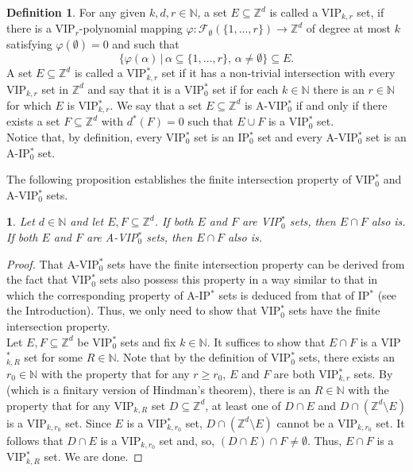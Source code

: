 \documentclass[11pt,american,preprint]{elsarticle}
\numberwithin{equation}{section}
\theoremstyle{plain}
\theoremstyle{plain*}
\theoremstyle{plain}
\theoremstyle{plain*}
\theoremstyle{plain}
\newtheorem{prop}[thm]{\protect\propositionname}
\theoremstyle{plain*}
\theoremstyle{remark}
\theoremstyle{remark*}
\theoremstyle{remark}
\theoremstyle{remark*}
\theoremstyle{remark}
\theoremstyle{remark*}
\theoremstyle{plain}
\theoremstyle{definition}
\newtheorem{defn}[thm]{Definition}
\theoremstyle{plain}
\theoremstyle{plain} %
\providecommand{\propositionname}{Proposition}
\newcommand{\N}{\mathbb{N}}
\newcommand{\Z}{\mathbb{Z}}
\begin{document}
\begin{defn}\label{3.defnOFVIP*}
For any given $k,d,r\in\N$, a set $E\subseteq \Z^d$ is called a VIP$_{k,r}$ set, if there is a VIP$_r$-polynomial mapping $\varphi:\mathcal F_\emptyset(\{1,...,r\})\rightarrow \Z^d$ of degree at most $k$ satisfying $\varphi(\emptyset)=0$ and such that 
$$\{\varphi(\alpha)\,|\,\alpha\subseteq \{1,...,r\},\,\alpha\neq\emptyset\}\subseteq E.$$
A set $E\subseteq \Z^d$ is called a VIP$_{k,r}^*$ set if it has a non-trivial intersection with every VIP$_{k,r}$ set in $\Z^d$ and say that it is a VIP$_0^
*$ set if for each $k\in\N$ there is an $r\in\N$ for which $E$ is VIP$_{k,r}^*$.
We say that a set $E\subseteq \Z^d$ is A-VIP$_0^*$ if and only if there exists a set $F\subseteq \Z^d$ with $d^*(F)=0$ such that $E\cup F$ is a VIP$_0^*$ set.\\
Notice that, by definition, every VIP$_0^*$ set is an IP$_0^*$ set and every A-VIP$_0^*$ set is an A-IP$_0^*$ set. 
\end{defn}
The following proposition establishes the finite intersection property of   VIP$_0^*$  and A-VIP$_0^*$ sets.
\begin{prop}\label{4.rem:IntersectionProperty}
Let $d\in\N$ and let $E,F\subseteq \Z^d$. If both $E$ and $F$ are {\rm VIP$_0^*$} sets, then $E\cap F$ also is. If both $E$ and $F$ are {\rm A-VIP$_0^*$} sets, then $E\cap F$ also is.
\end{prop}
\begin{proof}
That A-VIP$_0^*$ sets have the finite intersection property can be derived from the fact that VIP$_0^*$ sets also possess this property in a way similar to that in which the corresponding property of A-IP$^*$ sets is deduced from that of IP$^*$ (see the Introduction). Thus, we only need to show that VIP$_0^*$ sets have the finite intersection property. \\
 Let $E,F\subseteq \Z^d$ be VIP$_0^*$ sets and fix $k\in\N$. It suffices to show that $E\cap F$ is a VIP$_{k,R}^*$ set for some $R\in\N$.
 Note that by the definition of VIP$_0^*$ sets,  there exists an $r_0\in\N$  with the property that for any $r\geq r_0$, $E$ and $F$ are  both VIP$_{k,r}^*$ sets.  By \cite[Theorem 3.13]{graham1991RamseyTheory} (which is a finitary version of Hindman's theorem),  there is an $R\in\N$ with the property that for any VIP$_{k,R}$ set $D\subseteq \Z^d$, at least one of  $D\cap E$ and $D\cap (\Z^d\setminus E)$ is a VIP$_{k,r_0}$ set. Since $E$ is a VIP$_{k,r_0}^*$ set,  $D\cap (\Z^d\setminus E)$ cannot be a VIP$_{k,r_0}$ set. It follows that $D\cap E$ is a VIP$_{k,r_0}$ set and, so, $(D\cap E)\cap F\neq\emptyset$. Thus, $E\cap F$ is a VIP$_{k,R}^*$ set. We are done. 
\end{proof}
\end{document}
